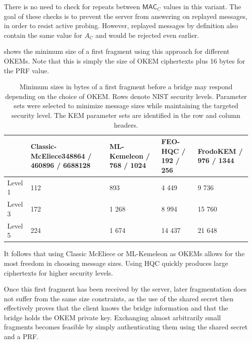 There is no need to check for repeats between $\mathsf{MAC}_C$ values in this variant. The goal of these checks is to prevent the server from answering on replayed messages, in order to resist active probing.
However, replayed messages by definition also contain the same value for $A_C$ and would be rejected even earlier.

 shows the minimum size of a first fragment using this approach for different OKEMs. Note that this is simply the size of OKEM ciphertexts plus 16 bytes for the PRF value.

\begin{table}
    \centering \small
    \begin{tabular}{@{} L{0.1\textwidth-\tabcolsep} | R{0.3\tabcolsep} R{0.2\tabcolsep} R{0.2\tabcolsep} R{0.2\textwidth-\tabcolsep} @{}}
        & Classic-McEliece\newline \footnotesize 348864 / 460896 / 6688128
        & ML-Kemeleon / 768 / 1024
        & FEO-HQC / 192 / 256
        & FrodoKEM / 976 / 1344
        \\ \hline
    Level 1 & 112 & 893 & 4 449 & 9 736 \\
    Level 3 & 172 & 1 268 & 8 994 & 15 760 \\
    Level 5 & 224 & 1 674 & 14 437 & 21 648
    \end{tabular}
    \caption[
        Minimum sizes in bytes of a first fragment before a bridge may respond depending on the choice of OKEM.
    ]{
        Minimum sizes in bytes of a first fragment before a bridge may respond depending on the choice of OKEM. Rows denote NIST security levels. Parameter sets were selected to minimize message sizes while maintaining the targeted security level. The KEM parameter sets are identified in the row and column headers.
    }
    \label{tab:frag-min-needed}
\end{table}

It follows that using Classic McEliece or ML-Kemeleon as OKEMs allows for the most freedom in choosing message sizes. Using HQC quickly produces large ciphertexts for higher security levels.

Once this first fragment has been received by the server, later fragmentation does not suffer from the same size constraints, as the use of the shared secret then effectively proves that the client knows the bridge information and that the bridge holds the OKEM private key. Exchanging almost arbitrarily small fragments becomes feasible by simply authenticating them using the shared secret and a PRF.

